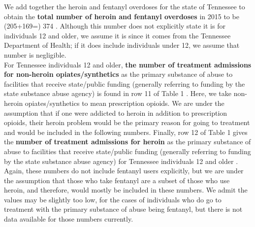 \documentclass[12pt]{article}
\begin{document}
We add together the heroin and fentanyl overdoses for the state of Tennessee to obtain the \textbf{total number of heroin and fentanyl overdoses} in 2015 to be (205+169=) 374 \cite{PDO}. Although this number does not explicitly state it is for individuals 12 and older, we assume it is since it comes from the Tennessee Department of Health; if it does include individuals under 12, we assume that number is negligible. \\

For Tennessee individuals 12 and older, \textbf{the number of treatment admissions for non-heroin opiates/synthetics} as the primary substance of abuse to facilities that receive state/public funding (generally referring to funding by the state substance abuse agency) is found in row 11 of Table 1 \cite{TEDS2015_SAMSHA_admissions}. Here, we take non-heroin opiates/synthetics to mean prescription opioids. We are under the assumption that if one were addicted to heroin in addition to prescription opioids, their heroin problem would be the primary reason for going to treatment and would be included in the following numbers. Finally, row 12 of Table 1 gives the \textbf{number of treatment admissions for heroin} as the primary substance of abuse to facilities that receive state/public funding (generally referring to funding by the state substance abuse agency) for Tennessee individuals 12 and older \cite{TEDS2015_SAMSHA_admissions}. Again, these numbers do not include fentanyl users explicitly, but we are under the assumption that those who take fentanyl are a subset of those who use heroin, and therefore, would mostly be included in these numbers. We admit the values may be slightly too low, for the cases of individuals who do go to treatment with the primary substance of abuse being fentanyl, but there is not data available for those numbers currently. \\
\end{document}
